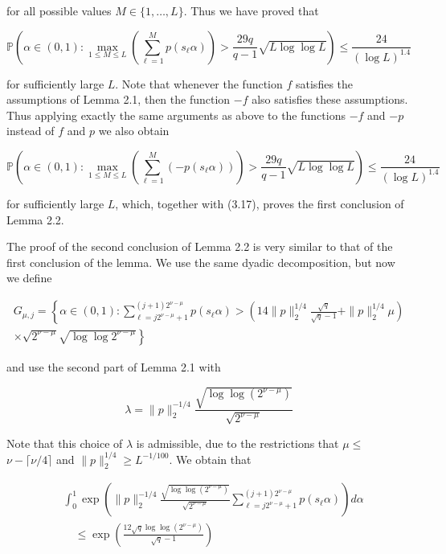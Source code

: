 \documentclass[10pt]{article}
\begin{document}
for all possible values $M \in\{1, \ldots, L\}$. Thus we have proved that


\begin{equation*}
\mathbb{P}\left(\alpha \in(0,1): \max _{1 \leqslant M \leqslant L}\left(\sum_{\ell=1}^{M} p\left(s_{\ell} \alpha\right)\right)>\frac{29 q}{q-1} \sqrt{L \log \log L}\right) \leqslant \frac{24}{(\log L)^{1.4}} \tag{3.17}
\end{equation*}


for sufficiently large $L$. Note that whenever the function $f$ satisfies the assumptions of Lemma 2.1, then the function $-f$ also satisfies these assumptions. Thus applying exactly the same arguments as above to the functions $-f$ and $-p$ instead of $f$ and $p$ we also obtain

$$
\mathbb{P}\left(\alpha \in(0,1): \max _{1 \leqslant M \leqslant L}\left(\sum_{\ell=1}^{M}\left(-p\left(s_{\ell} \alpha\right)\right)\right)>\frac{29 q}{q-1} \sqrt{L \log \log L}\right) \leqslant \frac{24}{(\log L)^{1.4}}
$$

for sufficiently large $L$, which, together with (3.17), proves the first conclusion of Lemma 2.2.

The proof of the second conclusion of Lemma 2.2 is very similar to that of the first conclusion of the lemma. We use the same dyadic decomposition, but now we define

$$
\begin{array}{r}
G_{\mu, j}=\left\{\alpha \in(0,1): \sum_{\ell=j 2^{\nu-\mu}+1}^{(j+1) 2^{\nu-\mu}} p\left(s_{\ell} \alpha\right)>\left(14\|p\|_{2}^{1 / 4} \frac{\sqrt{q}}{\sqrt{q}-1}+\|p\|_{2}^{1 / 4} \mu\right)\right. \\
\left.\times \sqrt{2^{\nu-\mu}} \sqrt{\log \log 2^{\nu-\mu}}\right\}
\end{array}
$$

and use the second part of Lemma 2.1 with

$$
\lambda=\|p\|_{2}^{-1 / 4} \frac{\sqrt{\log \log \left(2^{\nu-\mu}\right)}}{\sqrt{2^{\nu-\mu}}}
$$

Note that this choice of $\lambda$ is admissible, due to the restrictions that $\mu \leqslant$ $\nu-\lceil\nu / 4\rceil$ and $\|p\|_{2}^{1 / 4} \geqslant L^{-1 / 100}$. We obtain that

$$
\begin{aligned}
& \int_{0}^{1} \exp \left(\|p\|_{2}^{-1 / 4} \frac{\sqrt{\log \log \left(2^{\nu-\mu}\right)}}{\sqrt{2^{\nu-\mu}}} \sum_{\ell=j 2^{\nu-\mu}+1}^{(j+1) 2^{\nu-\mu}} p\left(s_{\ell} \alpha\right)\right) d \alpha \\
& \quad \leqslant \exp \left(\frac{12 \sqrt{q} \log \log \left(2^{\nu-\mu}\right)}{\sqrt{q}-1}\right)
\end{aligned}
$$
\end{document}
